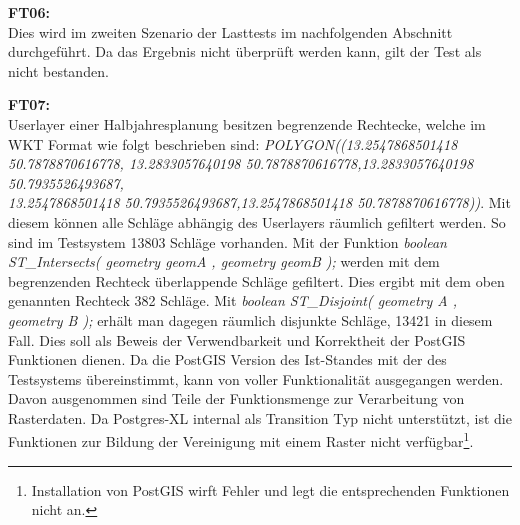 \textbf{FT06:}\\
Dies wird im zweiten Szenario der Lasttests im nachfolgenden Abschnitt durchgeführt.
Da das Ergebnis nicht überprüft werden kann, gilt der Test als nicht bestanden.

\textbf{FT07:}\\
Userlayer einer Halbjahresplanung besitzen begrenzende Rechtecke, welche im WKT Format wie folgt beschrieben sind: \textit{POLYGON((13.2547868501418 50.7878870616778,
13.2833057640198 50.7878870616778,13.2833057640198 50.7935526493687,\\
13.2547868501418 50.7935526493687,13.2547868501418 50.7878870616778))}.
Mit diesem können alle Schläge abhängig des Userlayers räumlich gefiltert werden.
So sind im Testsystem 13803 Schläge vorhanden.
Mit der Funktion \textit{boolean ST\_{}Intersects( geometry geomA , geometry geomB );} werden mit dem begrenzenden Rechteck überlappende Schläge gefiltert.
Dies ergibt mit dem oben genannten Rechteck 382 Schläge.
Mit \textit{boolean ST\_{}Disjoint( geometry A , geometry B );} erhält man dagegen räumlich disjunkte Schläge, 13421 in diesem Fall.
Dies soll als Beweis der Verwendbarkeit und Korrektheit der PostGIS Funktionen dienen.
Da die PostGIS Version des Ist-Standes mit der des Testsystems übereinstimmt, kann von voller Funktionalität  ausgegangen werden.
Davon ausgenommen sind Teile der Funktionsmenge zur Verarbeitung von Rasterdaten.
Da Postgres-XL internal als Transition Typ nicht unterstützt, ist die Funktionen zur Bildung der Vereinigung mit einem Raster nicht verfügbar\footnote{Installation von PostGIS wirft Fehler und legt die entsprechenden Funktionen nicht an.}.



